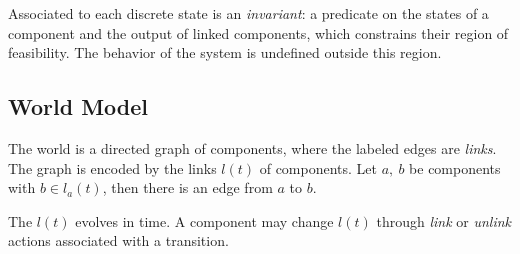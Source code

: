 Associated to each discrete state is an {\em invariant}: a predicate
on the states of a component and the output of linked components,
which constrains their region of feasibility.  The behavior of the
system is undefined outside this region.

\subsection{World Model\label{world-model}}

The world is a directed graph of components, where the labeled edges are
{\em links}.  
The graph is encoded by the links $l(t)$ of components.
Let $a,\ b$ be components with $b \in l_a(t)$, then there is an
edge from $a$ to $b$.

The $l(t)$ evolves in time.  A component may change
$l(t)$ through {\em link} or {\em unlink} actions
associated with a transition.

